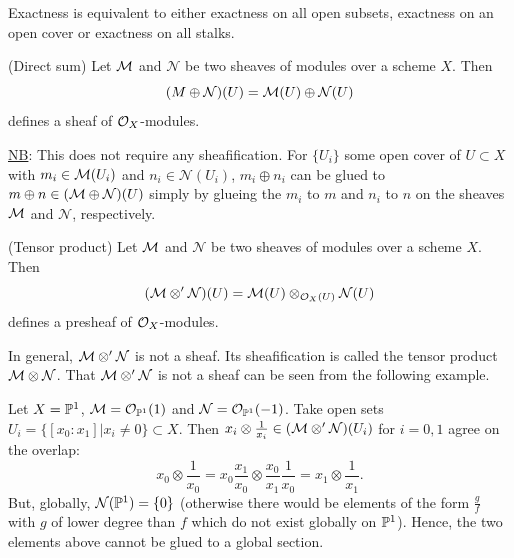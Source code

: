 \documentclass[a4paper,11pt]{article}
\begin{document}
			\begin{remark}\label{rem--exact-sequence}
				Exactness is equivalent to either exactness on all open subsets, exactness on an open cover or exactness on all stalks.
			\end{remark}

			\begin{defi}
				(Direct sum) Let $\M$ and $\mathcal{N}$ be two sheaves of modules over a scheme $X$. Then
				\begin{equation*}
					(M\oplus\mathcal{N})(U)=\M(U)\oplus\mathcal{N}(U)
				\end{equation*}
				defines a sheaf of $\O_X$-modules.
			\end{defi}

			\noindent\underline{NB}: This does not require any sheafification. For $\{U_i\}$ some open cover of $U\subset X$ with $m_i\in\M(U_i)$ and $n_i\in\mathcal{N}(U_i)$, $m_i\oplus n_i$ can be glued to $m\oplus n\in(\M\oplus\mathcal{N})(U)$ simply by glueing the $m_i$ to $m$ and $n_i$ to $n$ on the sheaves $\M$ and $\mathcal{N}$, respectively.

			\begin{defi}
				(Tensor product) Let $\M$ and $\mathcal{N}$ be two sheaves of modules over a scheme $X$. Then
				\begin{equation*}
					(\M\otimes^\prime\mathcal{N})(U)=\M(U)\otimes_{\O_X(U)}\mathcal{N}(U)
				\end{equation*}
				defines a presheaf of $\O_X$-modules.
			\end{defi}

			In general, $\M\otimes^\prime\mathcal{N}$ is not a sheaf. Its sheafification is called the tensor product $\M\otimes\mathcal{N}$.
			That $\M\otimes^\prime\mathcal{N}$ is not a sheaf can be seen from the following example.

			\begin{eg}
				Let $X=\P^1$, $\M=\O_{\P^1}(1)$ and $\mathcal{N}=\O_{\P^1}(-1)$. Take open sets $U_i=\{[x_0:x_1]|x_i\neq0\}\subset X$. Then $x_i\otimes\frac{1}{x_i}\in(\M\otimes^\prime\mathcal{N})(U_i)$ for $i=0,1$ agree on the overlap:
				\begin{equation*}
					x_0\otimes\frac{1}{x_0}=x_0\frac{x_1}{x_0}\otimes\frac{x_0}{x_1}\frac{1}{x_0}=x_1\otimes\frac{1}{x_1}.
				\end{equation*}
				But, globally, $\mathcal{N}(\P^1)=\{0\}$ (otherwise there would be elements of the form $\frac{g}{f}$ with $g$ of lower degree than $f$ which do not exist globally on $\P^1$). Hence, the two elements above cannot be glued to a global section.
			\end{eg}
\end{document}
